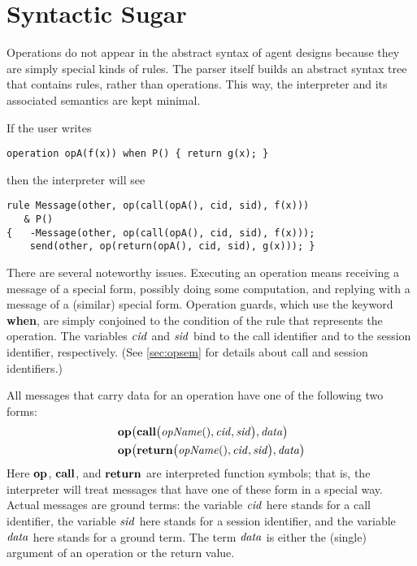\documentclass[a4paper,12pt,oneside,fleqn]{book} %
\begin{document}
\section{Syntactic Sugar}\label{sec:sugar} %

Operations do not appear in the abstract syntax of agent designs because
they are simply special kinds of rules. The parser itself builds an
abstract syntax tree that contains rules, rather than operations. This way,
the interpreter and its associated semantics are kept minimal.

\begin{example}
If the user writes
\begin{verbatim}
operation opA(f(x)) when P() { return g(x); }
\end{verbatim}
then the interpreter will see
\begin{verbatim}
rule Message(other, op(call(opA(), cid, sid), f(x)))
   & P()
{   -Message(other, op(call(opA(), cid, sid), f(x)));
    send(other, op(return(opA(), cid, sid), g(x))); }
\end{verbatim}
There are several noteworthy issues. Executing an operation means receiving
a message of a special form, possibly doing some computation, and replying
with a message of a (similar) special form. Operation guards, which use the
keyword {\bf when}, are simply conjoined to the condition of the rule that
represents the operation. The variables ${\it cid}$ and ${\it sid}$ bind to
the call identifier and to the session identifier, respectively. (See
\autoref{sec:opsem} for details about call and session identifiers.)
\end{example}

All messages that carry data for an operation have one of the following two
forms:
\begin{align}
  &{\bf op}\bigl(
    {\bf call}\bigl({\it opName}(), {\it cid}, {\it sid}\bigr),
    {\it data}
  \bigr)
\\
  &{\bf op}\bigl(
    {\bf return}\bigl({\it opName}(), {\it cid}, {\it sid}\bigr),
    {\it data}
  \bigr)
\end{align}
Here ${\bf op}$, $\bf call$, and $\bf return$ are interpreted function
symbols; that is, the interpreter will treat messages that have one of
these form in a special way. Actual messages are ground terms: the variable
$\it cid$ here stands for a call identifier, the variable $\it sid$ here
stands for a session identifier, and the variable $\it data$ here stands
for a ground term. The term $\it data$ is either the (single) argument of
an operation or the return value.
\end{document}
